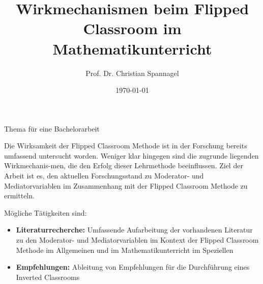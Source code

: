\documentclass{../cssheet}
\title{Wirkmechanismen beim Flipped Classroom im Mathematikunterricht}
\author{Prof. Dr. Christian Spannagel}
\date{\today}
\begin{document}
\vspace*{5mm}
\begin{center}
{\Large Thema für eine Bachelorarbeit}
\end{center}

\printtitle
\vspace*{1cm}

Die Wirksamkeit der Flipped Classroom Methode ist in der Forschung bereits umfassend untersucht worden. Weniger klar hingegen sind die zugrunde liegenden Wirkmechanis-men, die den Erfolg dieser Lehrmethode beeinflussen. Ziel der Arbeit ist es, den aktuellen Forschungsstand zu Moderator- und Mediatorvariablen im Zusammenhang mit der Flipped Classroom Methode zu ermitteln.

Mögliche Tätigkeiten sind:
\begin{itemize}
\item \textbf{Literaturrecherche:} Umfassende Aufarbeitung der vorhandenen Literatur zu den Moderator- und Mediatorvariablen im Kontext der Flipped Classroom Methode im Allgemeinen und im Mathematikunterricht im Speziellen
\item \textbf{Empfehlungen:} Ableitung von Empfehlungen für die Durchführung eines Inverted Classrooms
\end{itemize}

\vspace*{10mm}

\printlicense

\printsocials
\end{document}
